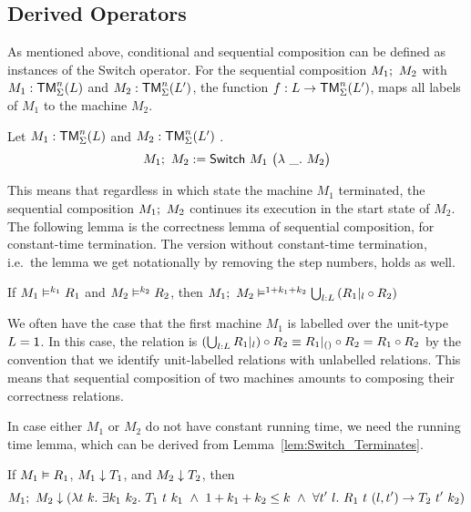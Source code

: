 \subsection{Derived Operators}
\label{sec:match-derived-operators}
%

As mentioned above, conditional and sequential composition can be defined as instances of the Switch operator.  For the sequential composition
$M_1 ;~ M_2$ with $M_1 : \mathsf{TM}_\Sigma^n(L)$ and $M_2 : \mathsf{TM}_\Sigma^n(L')$, the function $f : L \rightarrow \mathsf{TM}_\Sigma^n(L')$, maps all labels of $M_1$ to the
machine $M_2$.
\begin{definition}
  \label{def:Seq}
  Let $M_1 : \mathsf{TM}_\Sigma^n(L)$ and $M_2 : \mathsf{TM}_\Sigma^n(L')$ .
  \[
    M_1 ;~ M_2 := \mathsf{Switch}~M_1~
    \bigl(
    \lambda~\_.~M_2
    \bigr)
  \]
\end{definition}
This means that regardless in which state the machine $M_1$ terminated, the sequential composition $M_1 ;~ M_2$ continues its execution in the start
state of $M_2$.  The following lemma is the correctness lemma of sequential composition, for constant-time termination.  The version without
constant-time termination, i.e.\ the lemma we get notationally by removing the step numbers, holds as well.

\begin{lemma}
  \label{lem:Seq_RealiseIn}
  If $M_1 \mathrel{\vDash^{k_1}} R_1$ and $M_2 \mathrel{\vDash^{k_2}} R_2$, then
  $
  M_1 ;~ M_2 \mathrel{\vDash^{1+k_1+k_2}} \bigcup_{l:L} \left(R_1{|}_{l} \circ R_2 \right)
  $
\end{lemma}

We often have the case that the first machine $M_1$ is labelled over the unit-type $L = \mathsf{1}$.  In this case, the relation is
$\left(\bigcup_{l:L} R_1{|}_{l}\right) \circ R_2 \equiv R_1 {|}_{\mathsf{()}} \circ R_2 = R_1 \circ R_2$ by the convention that we identify unit-labelled
relations with unlabelled relations.  This means that sequential composition of two machines amounts to composing their correctness relations.

In case either $M_1$ or $M_2$ do not have constant running time, we need the running time lemma, which can be derived from
Lemma~\ref{lem:Switch_Terminates}.
\begin{lemma}
  \label{lem:Seq_TerminatesIn}
  If $M_1 \mathrel{\vDash} R_1$, $M_1 \mathrel{\downarrow} T_1$, and $M_2 \mathrel{\downarrow} T_2$, then
  \[
    M_1 \Seq M_2 \TerminatesIn
    \left(%
      \lambda t~k.~\exists k_1~k_2.~T_1~t~k_1 ~\land~ 1 + k_1 + k_2 \leq k ~\land~ \forall t'~l.~R_1~t~(l,t') \rightarrow T_2~t'~k_2%
    \right)
  \]
\end{lemma}


